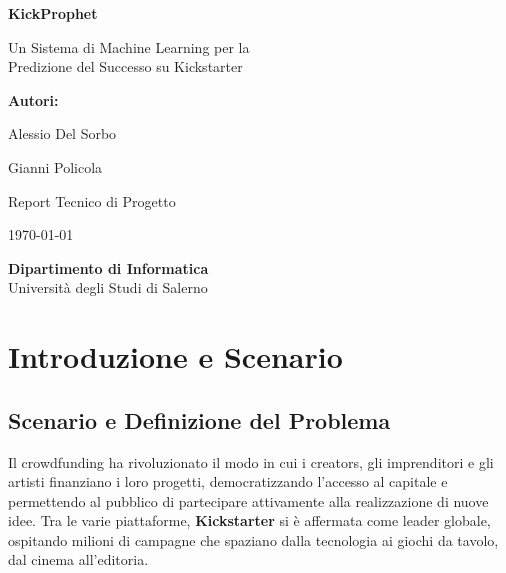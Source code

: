\documentclass[a4paper,14pt]{extarticle}
\begin{document}
\begin{titlepage}
    \centering
    \vspace*{2cm}
    
    {\Huge \textbf{KickProphet}\par}
    
    \vspace{1cm}
    
    {\LARGE Un Sistema di Machine Learning per la\\Predizione del Successo su Kickstarter\par}
    
    \vspace{3cm}
    
    {\Large \textbf{Autori:}\par}
    \vspace{0.2cm}
    {\Large Alessio Del Sorbo\par}
    {\Large Gianni Policola\par}
    
    \vfill
    
    {\Large Report Tecnico di Progetto\par}
    \vspace{0.5cm}
    {\Large \today\par}
    
    \vspace{2cm}
    
    \textbf{Dipartimento di Informatica} \\
    Università degli Studi di Salerno
    
\end{titlepage}

\tableofcontents
\newpage

\listoffigures
\newpage

\section{Introduzione e Scenario}

\subsection{Scenario e Definizione del Problema}
Il crowdfunding ha rivoluzionato il modo in cui i creators, gli imprenditori e gli artisti finanziano i loro progetti, democratizzando l'accesso al capitale e permettendo al pubblico di partecipare attivamente alla realizzazione di nuove idee. Tra le varie piattaforme, \textbf{Kickstarter} si è affermata come leader globale, ospitando milioni di campagne che spaziano dalla tecnologia ai giochi da tavolo, dal cinema all'editoria.
\end{document}
